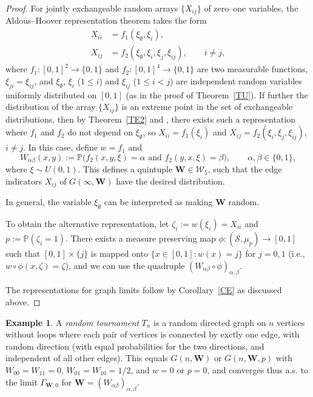 \documentclass[11pt,reqno,tbtags]{amsart}
\numberwithin{equation}{section}
\theoremstyle{definition}
\newtheorem{example}[theorem]{Example}
\theoremstyle{remark}
\newcommand{\refT}[1]{Theorem~\ref{#1}}
\newcommand{\refC}[1]{Corollary~\ref{#1}}
\newcommand\set[1]{\ensuremath{\{#1\}}}
\newcommand\bigpar[1]{\bigl(#1\bigr)}
\newcommand\ie{i.e.\spacefactor=1000}
\newcommand{\as}{a.s.\spacefactor=1000}
\renewcommand\P{\operatorname{\mathbb P{}}}
\newcommand\ga{\alpha}
\newcommand\gb{\beta}
\newcommand\gG{\Gamma}
\newcommand\cS{{\mathcal S}}
\newcommand\cW{\mathcal W}
\renewcommand{\=}{:=}
\newcommand\oi{[0,1]}
\newcommand{\exch}{exchangeable}
\newcommand{\gbwx}[1]{G(#1,\bW)}
\newcommand{\gbwoo}{\gbwx\infty}
\newcommand{\gbwn}{\gbwx{n}}
\newcommand{\gbwpx}[1]{G(#1,\bW,p)}
\newcommand{\gbwpn}{\gbwpx{n}}
\newcommand{\xio}{\xi_\emptyset}
\newcommand{\xii}{\xi_i}
\newcommand{\xij}{\xi_j}
\newcommand{\xiij}{\xi_{ij}}
\newcommand{\uoi}{U(0,1)}
\newcommand{\wab}{W_{\ga\gb}}
\newcommand{\wo}{w}%
\newcommand{\bW}{\mathbf{W}}
\newcommand{\setoi}{\set{0,1}}
\newcommand{\csp}{\cS}
\newcommand{\WW}{\cW_5}
\begin{document}
\begin{proof}
For jointly \exch{} random arrays \set{X_{ij}} of zero--one variables, 
the Aldous--Hoover representation theorem takes the form 
\cite[Theorem 7.22]{Kallenberg:exch} 
  \begin{align*}
X_{ii}&=f_1(\xio,\xii), \\	
X_{ij}&=f_2(\xio,\xii,\xij,\xiij), \qquad i\neq j,	
  \end{align*}
where $f_1:\oi^2\to\setoi$ and $f_2:\oi^4\to\setoi$ are two measurable
functions, $\xi_{ji}=\xiij$, and 
$\xio$, $\xii$ ($1\le i$) and $\xiij$ ($1\le i<j$) are independent
random variables uniformly distributed on $\oi$ (as in the proof of
\refT{TU}). 
If further the distribution of the array \set{X_{ij}} is an extreme
point in the set of \exch{} distributions, then by \refT{TE2} and
\cite[Lemma 7.35]{Kallenberg:exch}, there exists such a representation
where $f_1$ and $f_2$ do not depend on $\xio$, so 
$X_{ii}=f_1(\xii)$ and $X_{ij}=f_2(\xii,\xij,\xiij)$, $i\neq j$.	
In this case, define $\wo=f_1$ and
\begin{equation*}
  \wab(x,y)\=\P\bigpar{f_2(x,y,\xi)=\ga\text{ and } f_2(y,x,\xi)=\gb},
\qquad \ga,\gb\in\setoi,
\end{equation*}
where $\xi\sim\uoi$. This defines a quintuple $\bW\in\WW$, such that
the edge indicators $X_{ij}$ of $\gbwoo$ have the desired distribution.

In general, the variable $\xio$ can be interpreted as making $\bW$
random.

To obtain the alternative representation, let
$\zeta_i\=w(\xi_i)=X_{ii}$ and $p\=\P(\zeta_i=1)$. There exists a
measure preserving map $\phi:(\csp,\mu_p)\to\oi$ such that
$\oi\times\set{j}$ is mapped onto $\set{x\in\oi:\wo(x)=j}$ for $j=0,1$
(\ie, $\wo\circ\phi(x,\zeta)=\zeta$), and we can use the quadruple 
$(\wab\circ\phi)_{\ga,\gb}$.

The representations for graph limits follow by \refC{CE} as discussed
above.
\end{proof}

\begin{example}
  A \emph{random tournament} $T_n$
is a random directed graph on $n$ vertices without loops where
each pair of vertices is connected by exctly one edge, with random
direction (with equal probabilities for the two directions, and
independent of all other edges). 
This equals $\gbwn$ or $\gbwpn$ with $W_{00}=W_{11}=0$,
$W_{01}=W_{10}=1/2$, and $w=0$ or $p=0$, and converges thus \as{} to
the limit $\gG_{\bW,0}$ for $\bW=(\wab)_{\ga,\gb}$.
\end{example}
\end{document}

